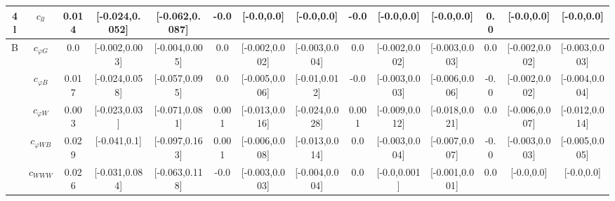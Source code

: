 \documentclass{article}
\begin{document}
\begin{table}[H]
\begin{tabular}{|c|c|c|c|c|c|c|c|c|c|c|c|c|c|}
\hline
\multirow{1}{*}{4l}
 & $c_{ll}$ & 0.014                             & [-0.024,0.052]                                 & [-0.062,0.087] & -0.0                             & [-0.0,0.0]                                 & [-0.0,0.0] & -0.0                             & [-0.0,0.0]                                 & [-0.0,0.0] & 0.0                             & [-0.0,0.0]                                 & [-0.0,0.0] \\ \cline{2-14}
\hline
\multirow{7}{*}{B}
 & $c_{\varphi G}$ & 0.0                             & [-0.002,0.003]                                 & [-0.004,0.005] & 0.0                             & [-0.002,0.002]                                 & [-0.003,0.004] & 0.0                             & [-0.002,0.002]                                 & [-0.003,0.003] & 0.0                             & [-0.002,0.002]                                 & [-0.003,0.003] \\ \cline{2-14}
 & $c_{\varphi B}$ & 0.017                             & [-0.024,0.058]                                 & [-0.057,0.095] & 0.0                             & [-0.005,0.006]                                 & [-0.01,0.012] & -0.0                             & [-0.003,0.003]                                 & [-0.006,0.006] & -0.0                             & [-0.002,0.002]                                 & [-0.004,0.004] \\ \cline{2-14}
 & $c_{\varphi W}$ & 0.003                             & [-0.023,0.03]                                 & [-0.071,0.081] & 0.001                             & [-0.013,0.016]                                 & [-0.024,0.028] & 0.001                             & [-0.009,0.012]                                 & [-0.018,0.021] & 0.0                             & [-0.006,0.007]                                 & [-0.012,0.014] \\ \cline{2-14}
 & $c_{\varphi WB}$ & 0.029                             & [-0.041,0.1]                                 & [-0.097,0.163] & 0.001                             & [-0.006,0.008]                                 & [-0.013,0.014] & 0.0                             & [-0.003,0.004]                                 & [-0.007,0.007] & -0.0                             & [-0.003,0.003]                                 & [-0.005,0.005] \\ \cline{2-14}
 & $c_{WWW}$ & 0.026                             & [-0.031,0.084]                                 & [-0.063,0.118] & -0.0                             & [-0.003,0.003]                                 & [-0.004,0.004] & 0.0                             & [-0.0,0.001]                                 & [-0.001,0.001] & 0.0                             & [-0.0,0.0]                                 & [-0.0,0.0] \\ \cline{2-14}

\end{tabular}
\end{table}
\end{document}

